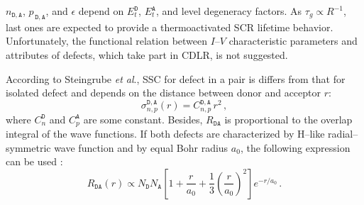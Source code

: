\documentclass[aip,jap, amsmath,amssymb,reprint]{revtex4-1}
\begin{document}
$n_{\mathtt{D,A}}$, $p_{\,\mathtt{D,A}}$, and $\epsilon$ depend on $E_t^{\mathtt{D}}$, $E_t^{\mathtt{A}}$, and level degeneracy  factors.
As $\tau_g\propto R^{-1}$, last ones are expected to provide a thermoactivated SCR lifetime behavior.
Unfortunately, the functional relation between $I$--$V$ characteristic parameters and attributes of defects, which take part in CDLR, is not suggested.

According to Steingrube \emph{et al}.\cite{CDLR:JAP},
SSC for defect in a pair is differs from that for isolated defect and depends on the distance between donor and acceptor $r$:
\begin{equation}
\label{eqSigma}
\sigma_{n,p}^{\mathtt{D,A}}(r)=C_{n,p}^{\mathtt{D,A}}\,r^2\,,
\end{equation}
where $C_{n}^{\mathtt{D}}$ and $C_{p}^{\mathtt{A}}$ are some constant.
Besides, $R_{\mathtt{DA}}$ is proportional to the overlap integral of the wave functions.
If both defects are characterized by H--like radial--symmetric wave function and by equal Bohr radius $a_0$,
the following expression can be used \cite{CDLR:JAP}:
\begin{equation}
\label{eqRda}
R_{\mathtt{DA}} (r) \propto N_{\mathtt{D}}N_{\mathtt{A}}\left[1+\frac{r}{a_0}+\frac{1}{3}\left(\frac{r}{a_0}\right)^2\right]
   e^{-r/a_0}\,.
\end{equation}


\end{document}
